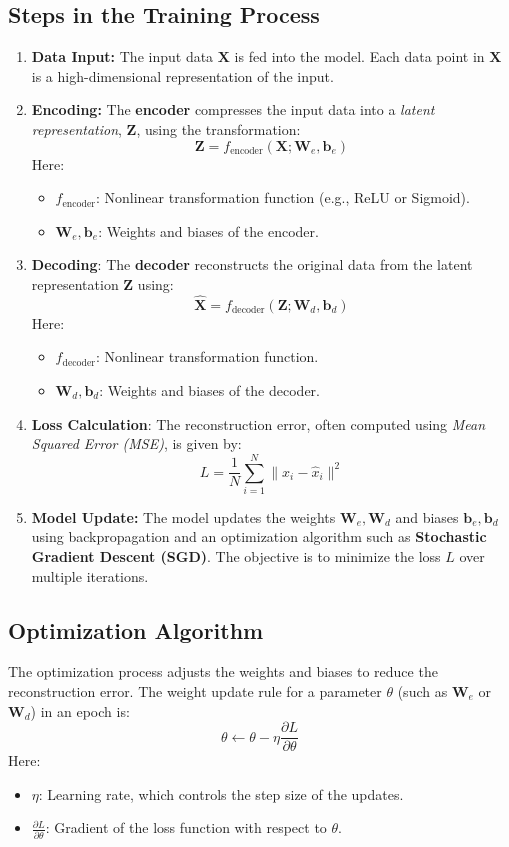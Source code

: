\documentclass[a4paper,12pt]{article}
\begin{document}
\subsection{Steps in the Training Process}
\begin{enumerate}
    \item \textbf{Data Input:} The input data \( \mathbf{X} \) is fed into the model. Each data point in \( \mathbf{X} \) is a high-dimensional representation of the input.
    \item \textbf{Encoding:} The \textbf{encoder} compresses the input data into a \textit{latent representation}, \( \mathbf{Z} \), using the transformation:
    \[
    \mathbf{Z} = f_{\text{encoder}}(\mathbf{X}; \mathbf{W}_e, \mathbf{b}_e)
    \]
    Here:
    \begin{itemize}
        \item \( f_{\text{encoder}} \): Nonlinear transformation function (e.g., ReLU or Sigmoid).
        \item \( \mathbf{W}_e, \mathbf{b}_e \): Weights and biases of the encoder.
    \end{itemize}
    \item \textbf{Decoding}: The \textbf{decoder} reconstructs the original data from the latent representation \( \mathbf{Z} \) using:
    \[
    \hat{\mathbf{X}} = f_{\text{decoder}}(\mathbf{Z}; \mathbf{W}_d, \mathbf{b}_d)
    \]
    Here:
    \begin{itemize}
        \item \( f_{\text{decoder}} \): Nonlinear transformation function.
        \item \( \mathbf{W}_d, \mathbf{b}_d \): Weights and biases of the decoder.
    \end{itemize}
    \item \textbf{Loss Calculation}: The reconstruction error, often computed using \textit{Mean Squared Error (MSE)}, is given by:
    \[
    L = \frac{1}{N} \sum_{i=1}^{N} \|x_i - \hat{x}_i\|^2
    \]
    \item \textbf{Model Update:} The model updates the weights \( \mathbf{W}_e, \mathbf{W}_d \) and biases \( \mathbf{b}_e, \mathbf{b}_d \) using backpropagation and an optimization algorithm such as \textbf{Stochastic Gradient Descent (SGD)}. The objective is to minimize the loss \( L \) over multiple iterations.
\end{enumerate}

\subsection{Optimization Algorithm}
The optimization process adjusts the weights and biases to reduce the reconstruction error. The weight update rule for a parameter \( \theta \) (such as \( \mathbf{W}_e \) or \( \mathbf{W}_d \)) in an epoch is:
\[
\theta \leftarrow \theta - \eta \frac{\partial L}{\partial \theta}
\]
Here:
\begin{itemize}
    \item \( \eta \): Learning rate, which controls the step size of the updates.
    \item \( \frac{\partial L}{\partial \theta} \): Gradient of the loss function with respect to \( \theta \).
\end{itemize}
\end{document}
